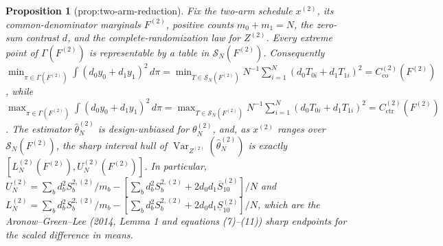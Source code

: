 \documentclass{article}
\newtheorem{proposition}{Proposition}
\begin{document}
\begin{proposition}[prop:two-arm-reduction]\label{prop:two-arm-reduction}
Fix the two-arm schedule \(x^{(2)}\), its common-denominator marginals \(F^{(2)}\), positive counts \(m_0+m_1=N\), the zero-sum contrast \(d\), and the complete-randomization law for \(Z^{(2)}\). Every extreme point of \(\Gamma(F^{(2)})\) is representable by a table in \(\mathcal S_N(F^{(2)})\). Consequently \(\min_{\pi\in\Gamma(F^{(2)})}\int(d_0y_0+d_1y_1)^2\,d\pi=\min_{T\in\mathcal S_N(F^{(2)})}N^{-1}\sum_{i=1}^N(d_0T_{0i}+d_1T_{1i})^2=C_{\mathrm{co}}^{(2)}(F^{(2)})\), while \(\max_{\pi\in\Gamma(F^{(2)})}\int(d_0y_0+d_1y_1)^2\,d\pi=\max_{T\in\mathcal S_N(F^{(2)})}N^{-1}\sum_{i=1}^N(d_0T_{0i}+d_1T_{1i})^2=C_{\mathrm{ctr}}^{(2)}(F^{(2)})\). The estimator \(\widehat\theta_N^{(2)}\) is design-unbiased for \(\theta_N^{(2)}\), and, as \(x^{(2)}\) ranges over \(\mathcal S_N(F^{(2)})\), the sharp interval hull of \(\operatorname{Var}_{Z^{(2)}}(\widehat\theta_N^{(2)})\) is exactly \([L_N^{(2)}(F^{(2)}),U_N^{(2)}(F^{(2)})]\). In particular, \(U_N^{(2)}=\sum_b d_b^2S_b^{2,(2)}/m_b-[\sum_b d_b^2S_b^{2,(2)}+2d_0d_1\overline S_{10}^{(2)}]/N\) and \(L_N^{(2)}=\sum_b d_b^2S_b^{2,(2)}/m_b-[\sum_b d_b^2S_b^{2,(2)}+2d_0d_1\underline S_{10}^{(2)}]/N\), which are the Aronow--Green--Lee (2014, Lemma 1 and equations (7)--(11)) sharp endpoints for the scaled difference in means.
\end{proposition}
\end{document}
